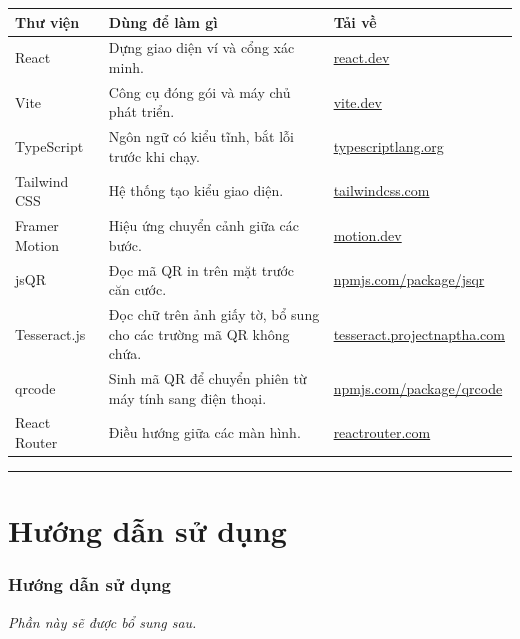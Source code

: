 \documentclass[a4paper,11pt]{article}
\begin{document}
\begin{longtable}{@{}p{2.9cm}p{6.6cm}p{4.4cm}@{}}
\toprule
\textbf{\sffamily Thư viện} & \textbf{\sffamily Dùng để làm gì} & \textbf{\sffamily Tải về} \\
\midrule
\endhead
React & Dựng giao diện ví và cổng xác minh. & \href{https://react.dev/}{react.dev} \\
\addlinespace
Vite & Công cụ đóng gói và máy chủ phát triển. & \href{https://vite.dev/}{vite.dev} \\
\addlinespace
TypeScript & Ngôn ngữ có kiểu tĩnh, bắt lỗi trước khi chạy. & \href{https://www.typescriptlang.org/}{typescriptlang.org} \\
\addlinespace
Tailwind CSS & Hệ thống tạo kiểu giao diện. & \href{https://tailwindcss.com/}{tailwindcss.com} \\
\addlinespace
Framer Motion & Hiệu ứng chuyển cảnh giữa các bước. & \href{https://motion.dev/}{motion.dev} \\
\addlinespace
jsQR & Đọc mã QR in trên mặt trước căn cước. & \href{https://www.npmjs.com/package/jsqr}{npmjs.com/package/jsqr} \\
\addlinespace
Tesseract.js & Đọc chữ trên ảnh giấy tờ, bổ sung cho các trường mã QR không chứa. & \href{https://tesseract.projectnaptha.com/}{tesseract.projectnaptha.com} \\
\addlinespace
qrcode & Sinh mã QR để chuyển phiên từ máy tính sang điện thoại. & \href{https://www.npmjs.com/package/qrcode}{npmjs.com/package/qrcode} \\
\addlinespace
React Router & Điều hướng giữa các màn hình. & \href{https://reactrouter.com/}{reactrouter.com} \\
\bottomrule
\end{longtable}

\vspace{4mm}
\hrule
\vspace{6mm}

\part*{\sffamily Hướng dẫn sử dụng}

\section{Hướng dẫn sử dụng}

\vspace{4mm}
{\color{muted}\itshape Phần này sẽ được bổ sung sau.}
\end{document}
